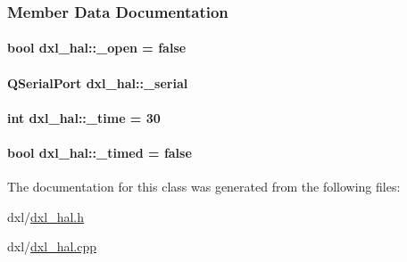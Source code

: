 \subsubsection{Member Data Documentation}
\hypertarget{a00003_a04831154c43fe4f7499ea0950e0f0999}{}
\paragraph[{\+\_\+open}]{\setlength{\rightskip}{0pt plus 5cm}bool dxl\+\_\+hal\+::\+\_\+open = false\hspace{0.3cm}{\ttfamily [private]}}\label{a00003_a04831154c43fe4f7499ea0950e0f0999}
\hypertarget{a00003_a785d0e35b81d779b54869cad668f9745}{}
\paragraph[{\+\_\+serial}]{\setlength{\rightskip}{0pt plus 5cm}Q\+Serial\+Port dxl\+\_\+hal\+::\+\_\+serial\hspace{0.3cm}{\ttfamily [private]}}\label{a00003_a785d0e35b81d779b54869cad668f9745}
\hypertarget{a00003_ae3d8733b5ca778b070218765ca0746ac}{}
\paragraph[{\+\_\+time}]{\setlength{\rightskip}{0pt plus 5cm}int dxl\+\_\+hal\+::\+\_\+time = 30\hspace{0.3cm}{\ttfamily [private]}}\label{a00003_ae3d8733b5ca778b070218765ca0746ac}
\hypertarget{a00003_a10d474daa3ca42b5c5ceb6558a955ca1}{}
\paragraph[{\+\_\+timed}]{\setlength{\rightskip}{0pt plus 5cm}bool dxl\+\_\+hal\+::\+\_\+timed = false\hspace{0.3cm}{\ttfamily [private]}}\label{a00003_a10d474daa3ca42b5c5ceb6558a955ca1}


The documentation for this class was generated from the following files\+:\begin{DoxyCompactItemize}
\item 
dxl/\hyperlink{a00013}{dxl\+\_\+hal.\+h}\item 
dxl/\hyperlink{a00012}{dxl\+\_\+hal.\+cpp}\end{DoxyCompactItemize}
